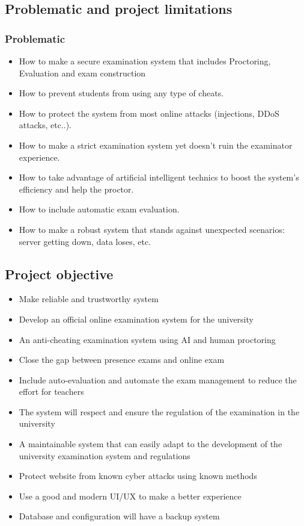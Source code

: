 \documentclass[]{uc2pfecaneva}
\begin{document}
    \subsection{Problematic and project limitations}
    \subsubsection{Problematic}

    \begin{itemize}
        \item How to make a secure examination system that includes Proctoring, Evaluation and exam construction
        \item How to prevent students from using any type of cheats.
        \item How to protect the system from most online attacks (injections, DDoS attacks, etc..).
        \item How to make a strict examination system yet doesn't ruin the examinator experience.
        \item How to take advantage of artificial intelligent technics to boost the system’s efficiency and help the proctor.
        \item How to include automatic exam evaluation.
        \item How to make a robust system that stands against unexpected scenarios: server getting down, data loses, etc.
    \end{itemize}



    \subsection{Project objective}

    \begin{itemize}
        \item Make reliable and trustworthy system
        \item Develop an official online examination system for the university
        \item An anti-cheating examination system using  AI and human proctoring
        \item Close the gap between presence exams and online exam
        \item Include auto-evaluation and automate the exam management to reduce the effort for teachers
        \item The system will respect and ensure the regulation of the examination in the university
        \item A maintainable system that can easily adapt  to the development of the university examination system and regulations
        \item Protect website from known cyber attacks using known methods
        \item Use a good and modern UI/UX to make a better experience
        \item Database and configuration will have a backup system
    \end{itemize}
\end{document}
